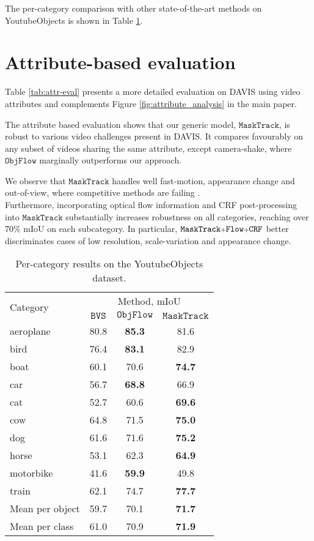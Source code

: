 \documentclass[10pt,twocolumn,letterpaper]{article}
\makeatletter
\renewcommand{\paragraph}{\@startsection{paragraph}{4}{\z@}{0.5ex \@plus 1ex \@minus .2ex}{-0.5em}{\normalfont \normalsize \bfseries}}
\makeatother
\begin{document}
\paragraph{YoutubeObjects}
The per-category comparison with other state-of-the-art methods on YoutubeObjects is shown in Table \ref{tab:youtube_cat}.



\section{Attribute-based evaluation}
\label{sec:attr_eval}

Table \ref{tab:attr-eval} presents a more detailed evaluation on DAVIS using video attributes and complements Figure \ref{fig:attribute_analysis} in the main paper.

The attribute based evaluation shows that our generic model, $\mathtt{MaskTrack}$,
is robust to various video challenges present in DAVIS. It compares favourably on any subset of videos sharing the same attribute, except camera-shake, where $\mathtt{ObjFlow}$ \cite{Tsai2016Cvpr} marginally outperforms our approach.

We observe that $\mathtt{MaskTrack}$ handles well fast-motion, appearance change and out-of-view, where competitive methods are failing \cite{Maerki2016Cvpr, Tsai2016Cvpr}.\\
Furthermore, incorporating optical flow information and CRF post-processing into $\mathtt{MaskTrack}$ substantially increases robustness on all categories, reaching over 70$\%$ mIoU on each subcategory.
In particular, $\mathtt{MaskTrack\mathsmaller{+}Flow \mathsmaller{+}CRF}$
better discriminates cases of low resolution, scale-variation and appearance change.

\begin{table}
\begin{centering}
\begingroup
\begin{tabular}{l@{   }|@{   }c@{   }c@{   }c@{   }}
\multirow{2}{*}{Category} & \multicolumn{3}{c}{Method, mIoU}\\
& $\mathtt{BVS}$ \cite{Maerki2016Cvpr} & $\mathtt{ObjFlow}$ \cite{Tsai2016Cvpr}& $\mathtt{MaskTrack}$ \tabularnewline
\hline
\hline
aeroplane& 80.8& \textbf{85.3} & 81.6\tabularnewline
bird & 76.4 & \textbf{83.1}& 82.9 \tabularnewline
boat& 60.1 & 70.6 & \textbf{74.7} \tabularnewline
car& 56.7 & \textbf{68.8} & 66.9 \tabularnewline
cat& 52.7 & 60.6 & \textbf{69.6}\tabularnewline
cow& 64.8& 71.5 & \textbf{75.0} \tabularnewline
dog& 61.6 & 71.6 & \textbf{75.2} \tabularnewline
horse& 53.1 & 62.3 & \textbf{64.9} \tabularnewline
motorbike& 41.6 & \textbf{59.9} & 49.8 \tabularnewline
train& 62.1& 74.7 & \textbf{77.7} \tabularnewline
\hline
Mean per object& 59.7 & 70.1 & \textbf{71.7} \tabularnewline
Mean per class& 61.0 & 70.9 & \textbf{71.9} \tabularnewline
\end{tabular}\endgroup
\par\end{centering}
\caption{\label{tab:youtube_cat}Per-category results on the YoutubeObjects dataset.}
\end{table}
\end{document}
